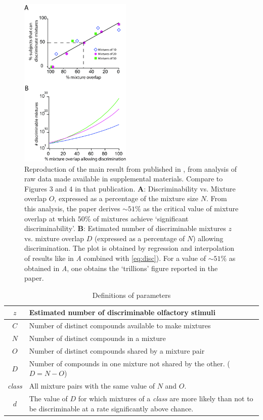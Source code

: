 \documentclass[letterpaper,twocolumn,10pt]{article}
\begin{document}
\begin{figure}[!hbt]
    \centering
    \includegraphics[width=0.475\textwidth]{figures/Fig2_Reconstruction}
    \caption{
Reproduction of the main result from published in \cite{bushdid_humans_2014}, 
from analysis of raw data made available in supplemental materials. Compare to Figures 3 and 4 in that publication. 
\textbf{A}: Discriminability vs. Mixture overlap $O$, expressed as a percentage of the mixture size $N$. 
From this analysis, the paper \cite{bushdid_humans_2014} derives $\sim51\%$ as the critical value of mixture overlap at which $50\%$ of mixtures achieve ‘significant discriminability’. 
\textbf{B}: Estimated number of discriminable mixtures $z$ vs. mixture overlap $D$ (expressed as a percentage of $N$) allowing discrimination. 
The plot is obtained by regression and interpolation of results like in \textit{A} combined with \ref{eq:disc}). 
For a value of $\sim51\%$ as obtained in \textit{A}, 
one obtains the `trillions' figure reported in the paper.}
    \label{fig:reconstruction}
\end{figure}

\begin{table}[hbtp]
\caption{Definitions of parameters}
\label{table:definitions}
\begin{tabulary}{0.5\textwidth}{| c | p{6.3cm} |}
\hline
$z$ & Estimated number of discriminable olfactory stimuli \\
\hline
$C$ & Number of distinct compounds available to make mixtures \\
\hline
$N$ & Number of distinct compounds in a mixture \\
\hline
$O$ & Number of distinct compounds shared by a mixture pair \\
\hline
$D$ & Number of compounds in one mixture not shared by the other.  ($D = N-O$) \\
\hline
\emph{class} & All mixture pairs with the same value of $N$ and $O$. \\
\hline
$d$ & The value of $D$ for which mixtures of a \emph{class} are more likely than not to be discriminable at a rate significantly above chance. \\
\hline
\end{tabulary}
\end{table}
\end{document}
